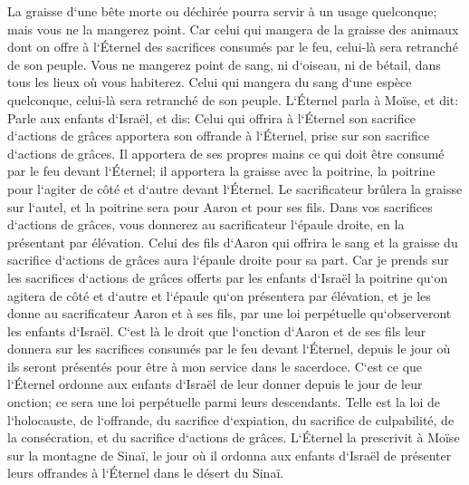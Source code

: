 \verse La graisse d`une bête morte ou déchirée pourra servir à un usage quelconque; mais vous ne la mangerez point. 
\verse Car celui qui mangera de la graisse des animaux dont on offre à l`Éternel des sacrifices consumés par le feu, celui-là sera retranché de son peuple. 
\verse Vous ne mangerez point de sang, ni d`oiseau, ni de bétail, dans tous les lieux où vous habiterez. 
\verse Celui qui mangera du sang d`une espèce quelconque, celui-là sera retranché de son peuple. 
\verse L`Éternel parla à Moïse, et dit: 
\verse Parle aux enfants d`Israël, et dis: Celui qui offrira à l`Éternel son sacrifice d`actions de grâces apportera son offrande à l`Éternel, prise sur son sacrifice d`actions de grâces. 
\verse Il apportera de ses propres mains ce qui doit être consumé par le feu devant l`Éternel; il apportera la graisse avec la poitrine, la poitrine pour l`agiter de côté et d`autre devant l`Éternel. 
\verse Le sacrificateur brûlera la graisse sur l`autel, et la poitrine sera pour Aaron et pour ses fils. 
\verse Dans vos sacrifices d`actions de grâces, vous donnerez au sacrificateur l`épaule droite, en la présentant par élévation. 
\verse Celui des fils d`Aaron qui offrira le sang et la graisse du sacrifice d`actions de grâces aura l`épaule droite pour sa part. 
\verse Car je prends sur les sacrifices d`actions de grâces offerts par les enfants d`Israël la poitrine qu`on agitera de côté et d`autre et l`épaule qu`on présentera par élévation, et je les donne au sacrificateur Aaron et à ses fils, par une loi perpétuelle qu`observeront les enfants d`Israël. 
\verse C`est là le droit que l`onction d`Aaron et de ses fils leur donnera sur les sacrifices consumés par le feu devant l`Éternel, depuis le jour où ils seront présentés pour être à mon service dans le sacerdoce. 
\verse C`est ce que l`Éternel ordonne aux enfants d`Israël de leur donner depuis le jour de leur onction; ce sera une loi perpétuelle parmi leurs descendants. 
\verse Telle est la loi de l`holocauste, de l`offrande, du sacrifice d`expiation, du sacrifice de culpabilité, de la consécration, et du sacrifice d`actions de grâces. 
\verse L`Éternel la prescrivit à Moïse sur la montagne de Sinaï, le jour où il ordonna aux enfants d`Israël de présenter leurs offrandes à l`Éternel dans le désert du Sinaï. 

